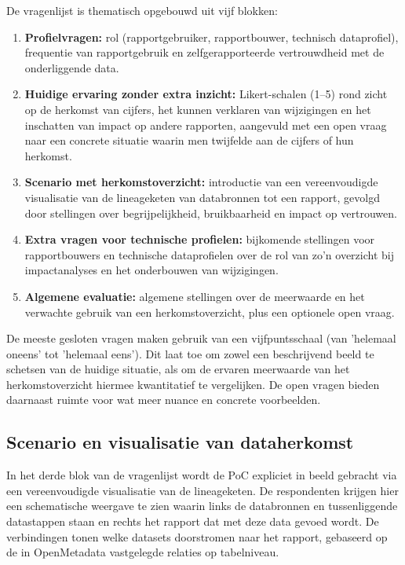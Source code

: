 De vragenlijst is thematisch opgebouwd uit vijf blokken:
\begin{enumerate}
    \item \textbf{Profielvragen:} rol (rapportgebruiker, rapportbouwer, technisch dataprofiel), frequentie van rapportgebruik en zelfgerapporteerde vertrouwdheid met de onderliggende data.
    \item \textbf{Huidige ervaring zonder extra inzicht:} Likert-schalen (1--5) rond zicht op de herkomst van cijfers, het kunnen verklaren van wijzigingen en het inschatten van impact op andere rapporten, aangevuld met een open vraag naar een concrete situatie waarin men twijfelde aan de cijfers of hun herkomst.
    \item \textbf{Scenario met herkomstoverzicht:} introductie van een vereenvoudigde visualisatie van de lineageketen van databronnen tot een rapport, gevolgd door stellingen over begrijpelijkheid, bruikbaarheid en impact op vertrouwen.
    \item \textbf{Extra vragen voor technische profielen:} bijkomende stellingen voor rapportbouwers en technische dataprofielen over de rol van zo'n overzicht bij impactanalyses en het onderbouwen van wijzigingen.
    \item \textbf{Algemene evaluatie:} algemene stellingen over de meerwaarde en het verwachte gebruik van een herkomstoverzicht, plus een optionele open vraag.
\end{enumerate}

De meeste gesloten vragen maken gebruik van een vijfpuntsschaal (van 'helemaal oneens' tot 'helemaal eens'). Dit laat toe om zowel een beschrijvend beeld te schetsen van de huidige situatie, als om de ervaren meerwaarde van het herkomstoverzicht hiermee kwantitatief te vergelijken. De open vragen bieden daarnaast ruimte voor wat meer nuance en concrete voorbeelden.\\

\subsection{Scenario en visualisatie van dataherkomst}

In het derde blok van de vragenlijst wordt de PoC expliciet in beeld gebracht via een vereenvoudigde visualisatie van de lineageketen. De respondenten krijgen hier een schematische weergave te zien waarin links de databronnen en tussenliggende datastappen staan en rechts het rapport dat met deze data gevoed wordt. De verbindingen tonen welke datasets doorstromen naar het rapport, gebaseerd op de in OpenMetadata vastgelegde relaties op tabelniveau.\\

